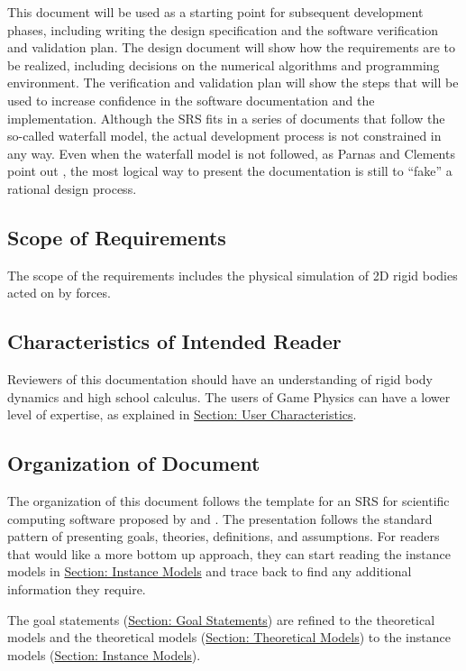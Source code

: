 \documentclass[12pt]{article}
\begin{document}
This document will be used as a starting point for subsequent development phases, including writing the design specification and the software verification and validation plan. The design document will show how the requirements are to be realized, including decisions on the numerical algorithms and programming environment. The verification and validation plan will show the steps that will be used to increase confidence in the software documentation and the implementation. Although the SRS fits in a series of documents that follow the so-called waterfall model, the actual development process is not constrained in any way. Even when the waterfall model is not followed, as Parnas and Clements point out \cite{parnasClements1986}, the most logical way to present the documentation is still to ``fake'' a rational design process.

\subsection{Scope of Requirements}
\label{Sec:ReqsScope}
The scope of the requirements includes the physical simulation of 2D rigid bodies acted on by forces.

\subsection{Characteristics of Intended Reader}
\label{Sec:ReaderChars}
Reviewers of this documentation should have an understanding of rigid body dynamics and high school calculus. The users of Game Physics can have a lower level of expertise, as explained in \hyperref[Sec:UserChars]{Section: User Characteristics}.

\subsection{Organization of Document}
\label{Sec:DocOrg}
The organization of this document follows the template for an SRS for scientific computing software proposed by \cite{koothoor2013} and \cite{smithLai2005}. The presentation follows the standard pattern of presenting goals, theories, definitions, and assumptions. For readers that would like a more bottom up approach, they can start reading the instance models in \hyperref[Sec:IMs]{Section: Instance Models} and trace back to find any additional information they require.

The goal statements (\hyperref[Sec:GoalStmt]{Section: Goal Statements}) are refined to the theoretical models and the theoretical models (\hyperref[Sec:TMs]{Section: Theoretical Models}) to the instance models (\hyperref[Sec:IMs]{Section: Instance Models}).
\end{document}
